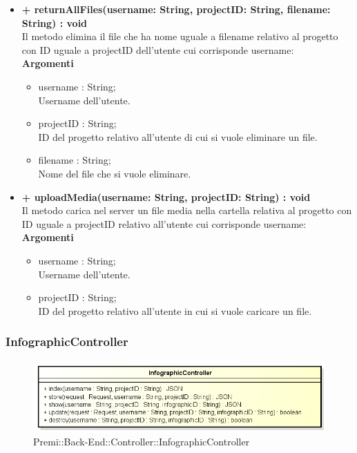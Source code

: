 \begin{itemize}
			\item \textbf{+ returnAllFiles(username: String, projectID: String, filename: String) : void}\\
			Il metodo elimina il file che ha nome uguale a filename relativo al progetto con ID uguale a projectID dell'utente cui corrisponde username:\\
			\textbf{Argomenti}
			\begin{itemize}
				\item username : String;\\
				Username dell'utente.
				\item projectID : String;\\
				ID del progetto relativo all'utente di cui si vuole eliminare un file.
				\item filename : String;\\
				Nome del file che si vuole eliminare.
			\end{itemize}
			
			\item \textbf{+ uploadMedia(username: String, projectID: String) : void}\\
			Il metodo carica nel server un file media nella cartella relativa al progetto con ID uguale a projectID relativo all'utente cui corrisponde username:\\
			\textbf{Argomenti}
			\begin{itemize}
				\item username : String;\\
				Username dell'utente.
				\item projectID : String;\\
				ID del progetto relativo all'utente in cui si vuole caricare un file.
			\end{itemize}
		\end{itemize}
		
\newpage
\subsubsection{InfographicController}
\begin{figure}[h]
\centering
\includegraphics[width=0.8\linewidth]{img/back_end_http_controllers_infographicController}
\caption[Premi::Back-End::Controller::InfographicController]{Premi::Back-End::Controller::InfographicController}
\label{fig:back_end_http_controllers_infographicController}
\end{figure}

